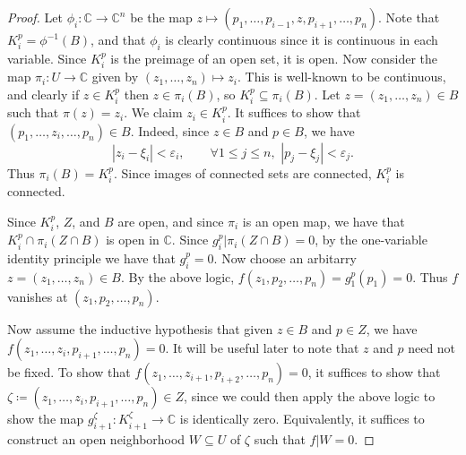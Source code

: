 \documentclass[11pt, letterpaper]{article}
\theoremstyle{plain}
\begin{document}
\begin{proof}
	Let $\phi _i : \mathbb{C}  \to \mathbb{C} ^n$ be the map $z\mapsto (p_1, \ldots ,p_{i-1} ,z, p_{i+1} , \ldots ,p_n)$. Note that $K_i^p=\phi ^{-1} (B)$, and that $\phi _i$ is clearly continuous since it is continuous in each variable. Since $K_i^p$ is the preimage of an open set, it is open. Now consider the map $\pi _i : U\to \mathbb{C} $ given by $(z_1, \ldots ,z_n)\mapsto z_i$. This is well-known to be continuous, and clearly if $z\in K_i^p$ then $z\in \pi _i(B)$, so $K_i^p \subseteq \pi _i(B)$. Let $z=(z_1, \ldots ,z_n)\in B$ such that $\pi (z)=z_i$. We claim $z_i\in K_i^p$. It suffices to show that $(p_1, \ldots ,z_i, \ldots ,p_n)\in B$. Indeed, since $z\in B$ and $p\in B$, we have
	\[
	 \left| z_i-\xi _i \right| <\varepsilon _i,\qquad \forall 1\leq j\leq n,\,\,\left| p_j-\xi _j \right| <\varepsilon_j
	.\]
	Thus $\pi _i(B)=K_i^p$. Since images of connected sets are connected, $K_i^p$ is connected.

	Since $K_i^p$, $Z$, and $B$ are open, and since $\pi _i$ is an open map, we have that $K_i^p \cap \pi _i(Z \cap B)$ is open in $\mathbb{C} $. Since $g_i^p|\pi _i(Z \cap B)=0$, by the one-variable identity principle we have that $g_i^p=0$. Now choose an arbitarry $z=(z_1, \ldots ,z_n)\in B$. By the above logic, $f(z_1,p_2, \ldots ,p_n)=g_1^p(p_1)=0$. Thus $f$ vanishes at $(z_1, p_2,\ldots ,p_n)$.

	Now assume the inductive hypothesis that given $z\in B$ and $p\in Z$, we have $f(z_1, \ldots ,z_i,p_{i+1} ,\ldots ,p_n)=0$. It will be useful later to note that $z$ and $p$ need not be fixed. To show that $f(z_1, \ldots ,z_{i+1} ,p_{i+2} ,\ldots ,p_n)=0$, it suffices to show that $\zeta \coloneqq (z_1, \ldots ,z_i,p_{i+1} , \ldots ,p_n)\in Z$, since we could then apply the above logic to show the map $g_{i+1} ^\zeta : K_{i+1} ^\zeta \to \mathbb{C} $ is identically zero. Equivalently, it suffices to construct an open neighborhood $W\subseteq U$ of $\zeta $ such that $f|W=0$.


\end{proof}
\end{document}
